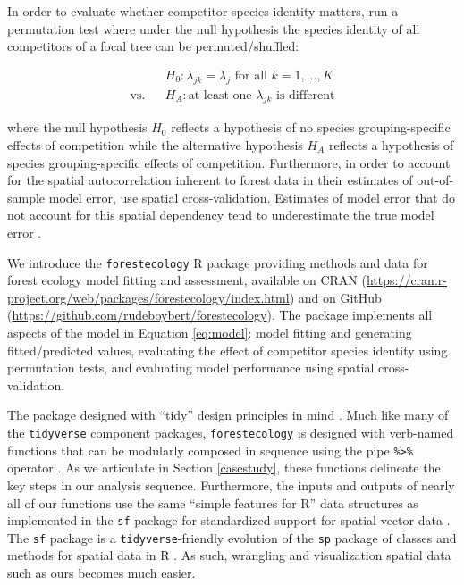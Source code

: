\documentclass[12pt]{article}
\begin{document}
In order to evaluate whether competitor species identity matters,
\citet{allen_permutation_2020} run a permutation test where under the
null hypothesis the species identity of all competitors of a focal tree
can be permuted/shuffled:

\begin{eqnarray}
\label{eq:permutation-hypothesis-test}
&&H_0: \lambda_{jk} = \lambda_{j} \mbox{ for all } k = 1, \ldots, K\\
\text{vs.}&&H_A: \text{at least one } \lambda_{jk} \mbox{ is different}
\end{eqnarray}

where the null hypothesis \(H_0\) reflects a hypothesis of no species
grouping-specific effects of competition while the alternative
hypothesis \(H_A\) reflects a hypothesis of species grouping-specific
effects of competition. Furthermore, in order to account for the spatial
autocorrelation inherent to forest data in their estimates of
out-of-sample model error, \citet{allen_permutation_2020} use spatial
cross-validation. Estimates of model error that do not account for this
spatial dependency tend to underestimate the true model error
\citep{roberts_cross-validation_2017}.

We introduce the \texttt{forestecology} R package providing methods and
data for forest ecology model fitting and assessment, available on CRAN
(\url{https://cran.r-project.org/web/packages/forestecology/index.html})
and on GitHub (\url{https://github.com/rudeboybert/forestecology}). The
package implements all aspects of the model in Equation \ref{eq:model}:
model fitting and generating fitted/predicted values, evaluating the
effect of competitor species identity using permutation tests, and
evaluating model performance using spatial cross-validation.

The package designed with ``tidy'' design principles in mind
\citep{wickham_welcome_2019}. Much like many of the \texttt{tidyverse}
component packages, \texttt{forestecology} is designed with verb-named
functions that can be modularly composed in sequence using the pipe
\texttt{\%\textgreater{}\%} operator \citep{bache_pipe_2020}. As we
articulate in Section \ref{casestudy}, these functions delineate the key
steps in our analysis sequence. Furthermore, the inputs and outputs of
nearly all of our functions use the same ``simple features for R'' data
structures as implemented in the \texttt{sf} package for standardized
support for spatial vector data \citep{pebesma_simple_2018}. The
\texttt{sf} package is a \texttt{tidyverse}-friendly evolution of the
\texttt{sp} package of classes and methods for spatial data in R
\citep{pebesma_sp_2005}. As such, wrangling and visualization spatial
data such as ours becomes much easier.
\end{document}
